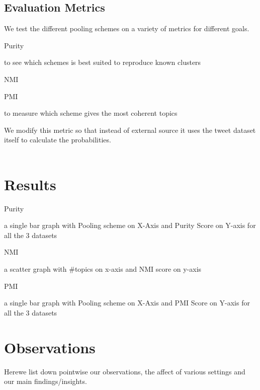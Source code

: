 \documentclass[10pt,a5paper,twoside]{article}
\begin{document}
\subsection{Evaluation Metrics}
We test the different pooling schemes on a variety of metrics for different goals.
\begin{compactenum}
\item Purity
\begin{compactitem}
\item to see which schemes is best suited to reproduce known clusters
\end{compactitem}
\item NMI
\item PMI
\begin{compactitem}
\item to measure which scheme gives the most coherent topics
\item We modify this metric so that instead of external source it uses the tweet dataset itself to calculate the probabilities.\\\\
\end{compactitem}
\end{compactenum}

\section{Results}
\begin{compactenum}
\item Purity
\begin{compactitem}
\item a single bar graph with Pooling scheme on X-Axis and Purity Score on Y-axis for all the 3 datasets
\end{compactitem}
\item NMI
\begin{compactitem}
\item a scatter graph with \#topics on x-axis and NMI score on y-axis
\end{compactitem}
\item{PMI}
\begin{compactitem}
\item a single bar graph with Pooling scheme on X-Axis and PMI Score on Y-axis for all the 3 datasets
\end{compactitem}
\end{compactenum}

\section{Observations}
Herewe list down pointwise our observations, the affect of various settings and our main findings/insights.\\\\
\end{document}
